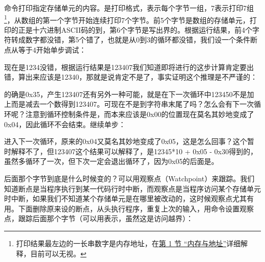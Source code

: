 

命令打印指定存储单元的内容。是打印格式，表示每个字节一组，7表示打印7组\footnote[22]{打印结果最左边的一长串数字是内存地址，在\hyperlink{db.ch17s01.id2766092}{第 1 节 “内存与地址”}详细解释，目前可以无视。}，从数组的第一个字节开始连续打印7个字节。前5个字节是数组的存储单元，打印的正是十六进制ASCII码的到，第6个字节是写出界的。根据运行结果，前4个字符转成数字都没错，第5个错了，也就是从0到3的循环都没错，我们设一个条件断点从等于4开始单步调试：




现在是1234没错，根据运行结果是123407我们知道即将进行的这步计算肯定要出错，算出来应该是12340，那就是说肯定不是了，事实证明这个推理是不严谨的：




的确是0x35，产生123407还有另外一种可能，就是在下一次循环中123450不是加上而是减去一个数得到123407。可现在不是到字符串末尾了吗？怎么会有下一次循环呢？注意到循环控制条件是，而本来应该是0x00的位置现在莫名其妙地变成了0x04，因此循环不会结束。继续单步：




进入下一次循环，原来的0x04又莫名其妙地变成了0x05，这是怎么回事？这个暂时解释不了，但123407这个结果可以解释了，是12345*\BookSplit{}10 + 0x05 - 0x30得到的，虽然多循环了一次，但下次一定会退出循环了，因为0x05的后面是。



后面那个字节到底是什么时候变的？可以用观察点（Watchpoint）来跟踪。我们知道断点是当程序执行到某一代码行时中断，而观察点是当程序访问某个存储单元时中断，如果我们不知道某个存储单元是在哪里被改动的，这时候观察点尤其有用。下面删除原来设的断点，从头执行程序，重复上次的输入，用命令设置观察点，跟踪后面那个字节（可以用表示，虽然这是访问越界）：


